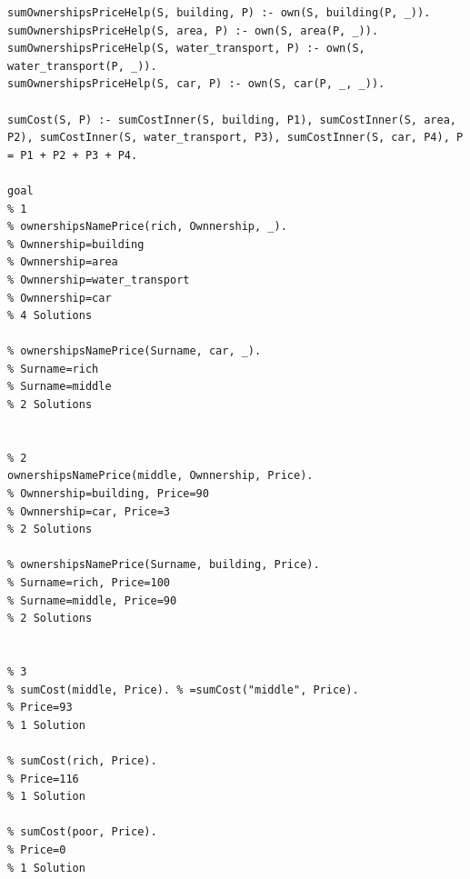 \documentclass[12pt]{report}
\begin{document}
\begin{lstlisting}
sumOwnershipsPriceHelp(S, building, P) :- own(S, building(P, _)).
sumOwnershipsPriceHelp(S, area, P) :- own(S, area(P, _)).
sumOwnershipsPriceHelp(S, water_transport, P) :- own(S, water_transport(P, _)).
sumOwnershipsPriceHelp(S, car, P) :- own(S, car(P, _, _)).

sumCost(S, P) :- sumCostInner(S, building, P1), sumCostInner(S, area, P2), sumCostInner(S, water_transport, P3), sumCostInner(S, car, P4), P = P1 + P2 + P3 + P4.

goal
% 1
% ownershipsNamePrice(rich, Ownnership, _).
% Ownnership=building
% Ownnership=area
% Ownnership=water_transport
% Ownnership=car
% 4 Solutions

% ownershipsNamePrice(Surname, car, _).
% Surname=rich
% Surname=middle
% 2 Solutions


% 2
ownershipsNamePrice(middle, Ownnership, Price).
% Ownnership=building, Price=90
% Ownnership=car, Price=3
% 2 Solutions

% ownershipsNamePrice(Surname, building, Price).
% Surname=rich, Price=100
% Surname=middle, Price=90
% 2 Solutions


% 3
% sumCost(middle, Price). % =sumCost("middle", Price).
% Price=93
% 1 Solution

% sumCost(rich, Price).
% Price=116
% 1 Solution

% sumCost(poor, Price).
% Price=0
% 1 Solution

	\end{lstlisting}
	

	
\end{document}
